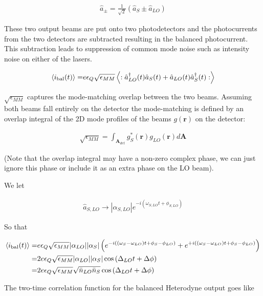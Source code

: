 \documentclass[12pt]{article}
\newcommand{\ep}{\epsilon}
\newcommand{\bv}[1]{\boldsymbol{#1}}
\begin{document}
\begin{align}
\hat{a}_{\pm} = \frac{1}{\sqrt{2}}\left(\hat{a}_S \pm \hat{a}_{LO}\right)
\end{align}

These two output beams are put onto two photodetectors and the photocurrents from the two detectors are subtracted resulting in the balanced photocurrent.
This subtraction leads to suppression of common mode noise such as intensity noise on either of the lasers.

\begin{align}
\Braket{i_{\text{bal}}(t)} =& e\ep_Q\sqrt{\ep_{MM}} \Braket{:\hat{a}^{\dag}_{LO}(t)\hat{a}_S(t) + \hat{a}_{LO}(t)\hat{a}^{\dag}_S(t):}\\
\end{align}

$\sqrt{\ep_{MM}}$ captures the mode-matching overlap between the two beams. Assuming both beams fall entirely on the detector the mode-matching is defined by an overlap integral of the 2D mode profiles of the beams $g(\bv{r})$ on the detector:

\begin{align}
\sqrt{\ep_{MM}} = \int_{\bv{A}_{det}} g_S^*(\bv{r})g_{LO}(\bv{r})d\bv{A}
\end{align}

(Note that the overlap integral may have a non-zero complex phase, we can just ignore this phase or include it as an extra phase on the LO beam).

We let

\begin{align}
\hat{a}_{S, LO} \rightarrow |\alpha_{S, LO}|e^{-i(\omega_{S,LO} t + \phi_{S, LO})}
\end{align}

So that

\begin{align}
\Braket{i_{\text{bal}}(t)} =& e\ep_Q\sqrt{\ep_{MM}}|\alpha_{LO}||\alpha_S|\left(e^{-i((\omega_S - \omega_{LO})t + \phi_S - \phi_{LO})} +  e^{+i((\omega_S - \omega_{LO})t + \phi_S - \phi_{LO})}\right)\\
=& 2e\ep_Q\sqrt{\ep_{MM}}|\alpha_{LO}||\alpha_S| \cos\left(\Delta_{LO} t + \Delta\phi\right)\\
=& 2e\ep_Q\sqrt{\ep_{MM}}\sqrt{\bar{n}_{LO}\bar{n}_S} \cos\left(\Delta_{LO} t + \Delta\phi\right)
\end{align}

The two-time correlation function for the balanced Heterodyne output goes like
\end{document}

